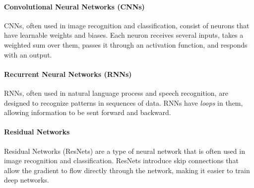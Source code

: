 \paragraph{Convolutional Neural Networks (CNNs)} CNNs, often used in image recognition and classification, consist of neurons that have learnable weights and biases. Each neuron receives several inputs, takes a weighted sum over them, passes it through an activation function, and responds with an output.

\paragraph{Recurrent Neural Networks (RNNs)} RNNs, often used in natural language process and speech recognition, are designed to recognize patterns in sequences of data. RNNs have \emph{loops} in them, allowing information to be sent forward and backward.

\paragraph{Residual Networks} Residual Networks (ResNets) are a type of neural network that is often used in image recognition and classification. ResNets introduce skip connections that allow the gradient to flow directly through the network, making it easier to train deep networks.




